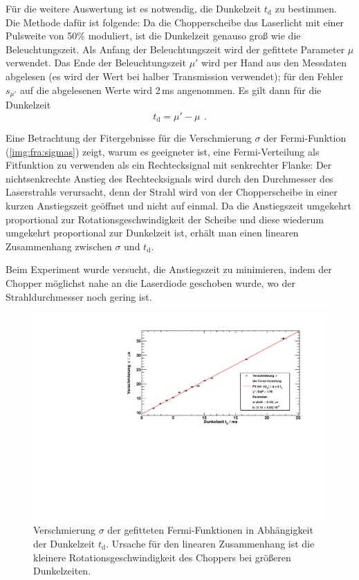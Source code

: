 Für die weitere Auswertung ist es notwendig, die Dunkelzeit $t_\text{d}$ zu bestimmen.
Die Methode dafür ist folgende:
Da die Chopperscheibe das Laserlicht mit einer Pulsweite von 50\% moduliert,
ist die Dunkelzeit genauso groß wie die Beleuchtungszeit.
Als Anfang der Beleuchtungszeit wird der gefittete Parameter $\mu$ verwendet.
Das Ende der Beleuchtungszeit $\mu'$ wird per Hand aus den Messdaten abgelesen
(es wird der Wert bei halber Transmission verwendet);
für den Fehler $s_{\mu'}$ auf die abgelesenen Werte wird 2\,ms angenommen.
Es gilt dann für die Dunkelzeit
\begin{equation}
  t_\text{d}=\mu'-\mu \ \, .
\end{equation}

Eine Betrachtung der Fitergebnisse für die Verschmierung $\sigma$ der Fermi-Funktion
(\autoref{img:fra:sigmas}) zeigt,
warum es geeigneter ist, eine Fermi-Verteilung als Fitfunktion zu verwenden als ein
Rechtecksignal mit senkrechter Flanke:
Der nichtsenkrechte Anstieg des Rechtecksignals wird durch den Durchmesser des Laserstrahls verursacht, denn
der Strahl wird von der Chopperscheibe in einer kurzen Anstiegszeit geöffnet und nicht auf einmal.
Da die Anstiegszeit umgekehrt proportional zur Rotationsgeschwindigkeit der Scheibe und diese
wiederum umgekehrt proportional zur Dunkelzeit ist, erhält man einen linearen Zusammenhang
zwischen $\sigma$ und $t_\text{d}$.

Beim Experiment wurde versucht, die Anstiegszeit zu minimieren, indem der Chopper möglichst
nahe an die Laserdiode geschoben wurde, wo der Strahldurchmesser noch gering ist.

\begin{figure}[H]
\begin{center}
  \includegraphics[width=\textwidth]{../img/part6/sigmaFit.pdf}
  \caption{Verschmierung $\sigma$ der gefitteten Fermi-Funktionen in Abhängigkeit der Dunkelzeit $t_\text{d}$.
  Ursache für den linearen Zusammenhang ist die kleinere Rotationsgeschwindigkeit des Choppers bei
  größeren Dunkelzeiten.}
  \label{img:fra:sigmas}
\end{center}
\end{figure}

